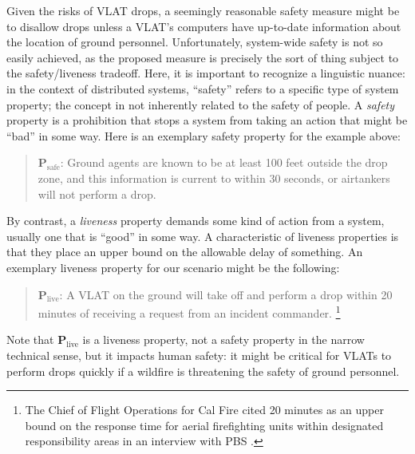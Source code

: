 \documentclass[]             %
{NASA}                       %
\theoremstyle{definition}
\begin{document}
Given the risks of VLAT drops, a seemingly reasonable safety measure
might be to disallow drops unless a VLAT's computers have up-to-date
information about the location of ground personnel. Unfortunately,
system-wide safety is not so easily achieved, as the proposed measure
is precisely the sort of thing subject to the safety/liveness
tradeoff. Here, it is important to recognize a linguistic nuance: in
the context of distributed systems, ``safety'' refers to a specific
type of system property; the concept in not inherently related to the
safety of people. A \emph{safety} property is a prohibition that stops
a system from taking an action that might be ``bad'' in some way. Here
is an exemplary safety property for the example above:
\begin{quote}
  $\textbf{P}_\textrm{safe}$: Ground agents are known to be at least
  100 feet outside the drop zone, and this information is current to
  within 30 seconds, or airtankers will not perform a drop.
\end{quote}
By contrast, a \emph{liveness} property demands some kind of action
from a system, usually one that is ``good'' in some way. A
characteristic of liveness properties is that they place an upper
bound on the allowable delay of something. An exemplary liveness
property for our scenario might be the following:
\begin{quote}
  $\textbf{P}_\textrm{live}$: A VLAT on the ground will take off and
  perform a drop within 20 minutes of receiving a request from an
  incident commander. \footnote{The Chief of Flight Operations for Cal
    Fire cited 20 minutes as an upper bound on the response time for
    aerial firefighting units within designated responsibility areas
    in an interview with PBS \cite{2021:aerialfirefighting}.}
\end{quote} Note that $\textbf{P}_\textrm{live}$
is a liveness property, not a safety property in the narrow technical
sense, but it impacts human safety: it might be critical for VLATs to
perform drops quickly if a wildfire is threatening the safety of
ground personnel.
\end{document}
